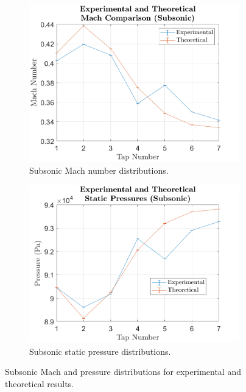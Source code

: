\documentclass[runningheads]{llncs}
\begin{document}
\begin{figure}[h]
    \centering
    \begin{subfigure}{0.49\textwidth}
    \includegraphics[width=\textwidth]{figures/subsonic_Mach_distributions.png}
    \caption{Subsonic Mach number distributions.}
    \label{fig:subsonic_Mach}
    \end{subfigure}
    \hfill
    \begin{subfigure}{0.49\textwidth}
    \includegraphics[width=\textwidth]{figures/subsonic_pressure_distribution_exp_vs_thy.png}
    \caption{Subsonic static pressure distributions.}
    \label{fig:subsonic_pressure_comp}
    \end{subfigure}
    \caption{Subsonic Mach and pressure distributions for experimental and theoretical results.}
    \label{fig:subsonic_comp}
\end{figure}
\end{document}
